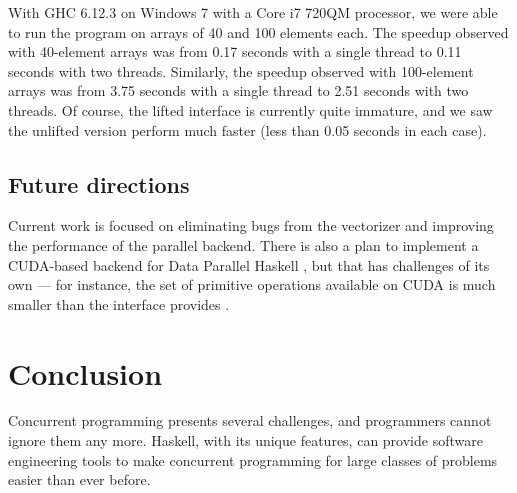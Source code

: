 \documentclass[a4paper]{acmtrans2m}
\begin{document}
With GHC 6.12.3 on Windows 7 with a Core i7 720QM processor, we were able to run the
program on arrays of 40 and 100 elements each. The speedup observed with 40-element
arrays was from 0.17 seconds with a single thread to 0.11 seconds with two threads.
Similarly, the speedup observed with 100-element arrays was from 3.75 seconds with a
single thread to 2.51 seconds with two threads. Of course, the lifted interface is
currently quite immature, and we saw the unlifted version perform much faster (less
than 0.05 seconds in each case).

\subsection{Future directions}

Current work is focused on eliminating bugs from the vectorizer and improving the 
performance of the parallel backend. There is also a plan to implement a CUDA-based
backend for Data Parallel Haskell \cite{Dijk:2008}, but that has challenges of its own --- for
instance, the set of primitive operations available on CUDA is much smaller than the 
interface provides \cite{Leshchinskiy:2008}.

\section{Conclusion}

Concurrent programming presents several challenges, and programmers cannot ignore them
any more. Haskell, with its unique features, can provide software engineering 
tools to make concurrent programming for large classes of problems easier than ever
before.



\end{document}
